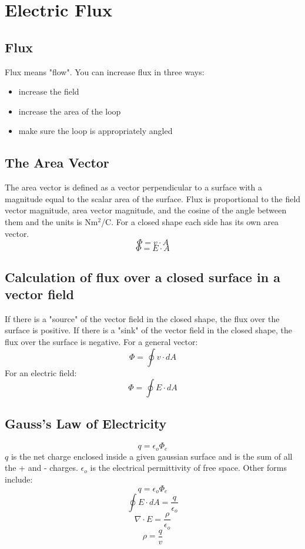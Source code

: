 \section{Electric Flux}

\subsection{Flux}
Flux means "flow". You can increase flux in three ways:
\begin{itemize}
	\item increase the field
	\item increase the area of the loop
	\item make sure the loop is appropriately angled
\end{itemize}

\subsection{The Area Vector}
The area vector is defined as a vector perpendicular to a surface with a magnitude equal to the scalar area of the surface. Flux is proportional to the field vector magnitude, area vector magnitude, and the cosine of the angle between them and the units is Nm$^2$/C. For a closed shape each side has its own area vector.
\[\Phi = v \cdot A\]
\[\Phi = E \cdot A\]

\subsection{Calculation of flux over a closed surface in a vector field}
If there is a "source" of the vector field in the closed shape, the flux over the surface is positive. If there is a "sink" of the vector field in the closed shape, the flux over the surface is negative. 
For a general vector:
\[\Phi = \oint v\cdot dA\]
For an electric field:
\[\Phi = \oint E \cdot dA\]

\subsection{Gauss's Law of Electricity}
\[q=\epsilon_o\Phi_e\]
$q$ is the net charge enclosed inside a given gaussian surface and is the sum of all the + and - charges. $\epsilon_o$ is the electrical permittivity of free space. Other forms include:
\[q=\epsilon_o\Phi_e\]
\[\oint E\cdot dA = \frac{q}{\epsilon_o}\]
\[\nabla \cdot E = \frac{\rho}{\epsilon_o}\]
\[\rho = \frac{q}{v}\]

